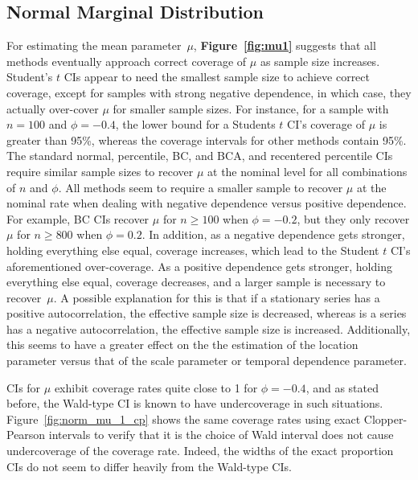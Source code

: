 \documentclass[10pt]{article}
\begin{document}
\subsection*{Normal Marginal Distribution}
For estimating the mean parameter~$\mu$, \textbf{Figure~\ref{fig:mu1}} suggests 
that all methods eventually approach correct coverage of $\mu$ as sample size 
increases. Student's $t$ CIs appear to need the smallest sample size to achieve 
correct coverage, except for samples with strong negative dependence, in which 
case, they actually over-cover $\mu$ for smaller sample sizes. For instance, for 
a sample with $n = 100$ and $\phi = -0.4$, the lower bound for a Students $t$ 
CI's coverage of $\mu$ is greater than 95\%, whereas the coverage intervals for 
other methods contain 95\%. The standard normal, percentile, BC, and BCA, and 
recentered percentile CIs require similar sample sizes to recover $\mu$ at the 
nominal level for all combinations of $n$ and $\phi$. All methods seem to 
require a smaller sample to recover $\mu$ at the nominal rate when dealing with 
negative dependence versus positive dependence. For example, BC CIs recover 
$\mu$ for $n \geq 100$ when $\phi = -0.2$, but they only recover $\mu$ for 
$n \geq 800$ when $\phi = 0.2$. In addition, as a negative dependence gets 
stronger, holding everything else equal, coverage increases, which lead to the 
Student $t$ CI's aforementioned over-coverage. As a positive dependence gets 
stronger, holding everything else equal, coverage decreases, and a larger sample 
is necessary to recover~$\mu$. A possible explanation for this is that if a 
stationary series has a positive 
autocorrelation, the effective sample
size is decreased, whereas is a series has a negative autocorrelation, the
effective sample size is increased. Additionally, this seems to have a 
greater effect on the the estimation of the location parameter versus that
of the scale parameter or temporal dependence parameter.


CIs for $\mu$ exhibit coverage rates quite close to 1 for $\phi = -0.4$, and
as stated before, the Wald-type CI is known to have undercoverage in such 
situations.
Figure~\ref{fig:norm_mu_1_cp} shows the same coverage rates using exact 
Clopper-Pearson intervals to verify that it is the choice of Wald interval
does not cause undercoverage of the coverage rate. Indeed, the widths of the
exact proportion CIs do not seem to differ heavily from the Wald-type CIs.
\end{document}

